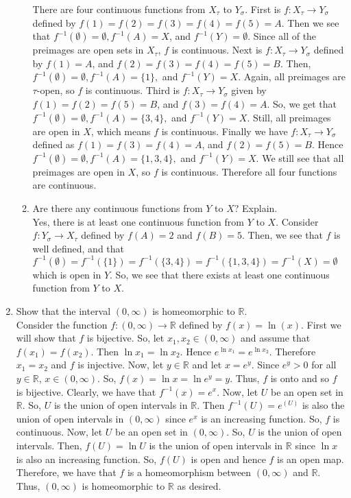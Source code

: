 \documentclass[12pt]{article}
\begin{document}
\begin{enumerate}
\begin{enumerate}
There are four continuous functions from $X_{\tau}$ to $Y_{\sigma}$. First is $f:X_{\tau}\rightarrow Y_{\sigma}$ defined by $f(1)=f(2)=f(3)=f(4)=f(5)=A$. Then we see that $f^{-1}(\emptyset)=\emptyset, f^{-1}(A)=X$, and $f^{-1}(Y)=\emptyset$. Since all of the preimages are open sets in $X_{\tau}$, $f$ is continuous. Next is $f:X_{\tau}\rightarrow Y_{\sigma}$ defined by $f(1)=A$, and $f(2)=f(3)=f(4)=f(5)=B$. Then, $f^{-1}(\emptyset)=\emptyset, f^{-1}(A)=\{1\},$ and $f^{-1}(Y)=X$. Again, all preimages are $\tau$-open, so $f$ is continuous. Third is $f:X_{\tau}\rightarrow Y_{\sigma}$ given by $f(1)=f(2)=f(5)=B$, and $f(3)=f(4)=A$. So, we get that $f^{-1}(\emptyset)=\emptyset, f^{-1}(A)=\{3, 4\},$ and $f^{-1}(Y)=X$. Still, all preimages are open in $X$, which means $f$ is continuous. Finally we have $f:X_{\tau}\rightarrow Y_{\sigma}$ defined as $f(1)=f(3)=f(4)=A$, and $f(2)=f(5)=B$. Hence $f^{-1}(\emptyset)=\emptyset, f^{-1}(A)=\{1, 3, 4\},$ and $f^{-1}(Y)=X$. We still see that all preimages are open in $X$, so $f$ is continuous. Therefore all four functions are continuous.
\item Are there any continuous functions from $Y$ to $X$? Explain.\\
Yes, there is at least one continuous function from $Y$ to $X$. Consider $f:Y_{\sigma}\rightarrow X_{\tau}$ defined by $f(A)=2$ and $f(B)=5$. Then, we see that $f$ is well defined, and that $f^{-1}(\emptyset)=f^{-1}(\{1\})=f^{-1}(\{3, 4\})=f^{-1}(\{1,3,4\})=f^{-1}(X)=\emptyset$ which is open in $Y$. So, we see that there exists at least one continuous function from $Y$ to $X$.
\end{enumerate}

\item Show that the interval $(0,\infty)$ is homeomorphic to $\mathbb{R}$.\\

Consider the function $f:(0,\infty)\rightarrow\mathbb{R}$ defined by $f(x)=\ln(x)$. First we will show that $f$ is bijective. So, let $x_1,x_2\in(0,\infty)$ and assume that $f(x_1)=f(x_2)$. Then $\ln x_1=\ln x_2$. Hence $e^{\ln x_1}=e^{\ln x_2}$. Therefore $x_1=x_2$ and $f$ is injective. Now, let $y\in\mathbb{R}$ and let $x=e^y$. Since $e^y>0$ for all $y\in\mathbb{R}$, $x\in(0,\infty)$. So, $f(x)=\ln x=\ln e^y=y$. Thus, $f$ is onto and so $f$ is bijective. Clearly, we have that $f^{-1}(x)=e^x$. Now, let $U$ be an open set in $\mathbb{R}$. So, $U$ is the union of open intervals in $\mathbb{R}$. Then $f^{-1}(U)=e^(U)$ is also the union of open intervals in $(0,\infty)$ since $e^x$ is an increasing function. So, $f$ is continuous. Now, let $U$ be an open set in $(0,\infty)$. So, $U$ is the union of open intervals. Then, $f(U)=\ln U$ is the union of open intervals in $\mathbb{R}$ since $\ln x$ is also an increasing function. So, $f(U)$ is open and hence $f$ is an open map. Therefore, we have that $f$ is a homeomorphism between $(0,\infty)$ and $\mathbb{R}$. Thus, $(0,\infty)$ is homeomorphic to $\mathbb{R}$ as desired.\\


\end{enumerate}
\end{document}
